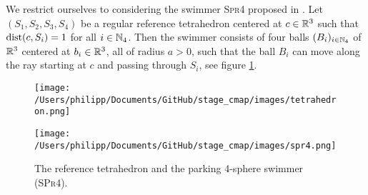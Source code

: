 \label{sec:modeling}
We restrict ourselves to considering the swimmer \textsc{Spr4} proposed in \cite{Alouges2013}. Let $(S_1, S_2, S_3, S_4)$ be a regular reference tetrahedron centered at $c \in \mathbb{R}^3$ such that $\operatorname{dist}(c, S_i) = 1$ for all $i \in \mathbb{N}_4$. Then the swimmer consists of four balls $(B_i)_{i \in \mathbb{N}_4}$ of $\mathbb{R}^3$ centered at $b_i \in \mathbb{R}^3$, all of radius $a > 0$, such that the ball $B_i$ can move along the ray starting at $c$ and passing through $S_i$, see figure \ref{fig:reference tetrahedron and spr4}.

\begin{figure}[h]
    \centering
    \begin{minipage}{0.45\textwidth}
        \centering
        \texttt{[image: /Users/philipp/Documents/GitHub/stage\_cmap/images/tetrahedron.png]}
    \end{minipage}
    \begin{minipage}{0.45\textwidth}
        \centering
        \texttt{[image: /Users/philipp/Documents/GitHub/stage\_cmap/images/spr4.png]} %
    \end{minipage}
    \caption{The reference tetrahedron and the parking 4-sphere swimmer (\textsc{SPr4}).}
    \label{fig:reference tetrahedron and spr4}
\end{figure}

